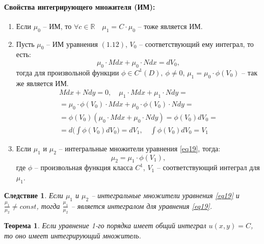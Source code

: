 \documentclass[11pt,a4paper,oneside]{report}
\theoremstyle{definition}
\theoremstyle{plain}
\newtheorem{theorem}{Теорема}[section]
\newtheorem*{effect}{Следствие}
\theoremstyle{remark}
\begin{document}
\paragraph*{Свойства интегрирующего множителя (ИМ):}

\begin{enumerate}
    \item Если $\mu_0$ -- ИМ, то $\forall c \in \mathbb{R} \quad \mu_1 = C \cdot \mu_0$ -- тоже является ИМ.
    \item Пусть $\mu_0$ -- ИМ уравнения $(1.12)$, $V_0$ -- соответствующий ему интеграл, то есть:
          \begin{equation*}
              \mu_0 \cdot Mdx + \mu_0 \cdot N dx = d V_0,
          \end{equation*}
          тогда для произвольной функции $\phi \in C^1(D), \ \phi \ne 0$, $\mu_1 = \mu_0 \cdot \phi(V_0)$ -- так же является ИМ.
          \begin{multline*}
              Mdx + Ndy = 0, \quad \mu_1 \cdot Mdx + \mu_1 \cdot N dy = \\
              = \mu_0 \cdot \phi(V_0)\cdot Mdx + \mu_0 \cdot \phi(V_0)\cdot Ndy = \\
              = \phi(V_0)(\mu_0 \cdot Mdx + \mu_0 \cdot N dy) = \phi(V_0)dV_0 = \\
              = d\bigg(\int \phi(V_0)dV_0\bigg) = dV_1, \quad \int \phi(V_0)dV_0 = V_1
          \end{multline*}
    \item Если $\mu_1$ и $\mu_2$ -- интегральные множители уравнения \ref{eq19}, тогда:
          \begin{equation*}
              \mu_2 = \mu_1 \cdot \phi(V_1),
          \end{equation*}
          где $\phi$ -- произвольная функция класса $C^1$, $V_1$ -- соответствующий интеграл для $\mu_1$.
\end{enumerate}

\begin{effect}
    Если $\mu_1$ и $\mu_2$ -- интегральные множители уравнения \ref{eq19} и $\frac{\mu_1}{\mu_2} \ne const$, тогда $\frac{\mu_1}{\mu_2}$ -- является интегралом для уравнения \ref{eq19}.
\end{effect}

\begin{theorem}
    Если уравнение 1-го порядка имеет общий интеграл $u(x,y) = C$, то оно имеет интегрирующий множитель.
\end{theorem}
\end{document}
